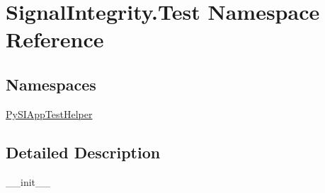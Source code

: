 \hypertarget{namespaceSignalIntegrity_1_1Test}{}\section{Signal\+Integrity.\+Test Namespace Reference}
\label{namespaceSignalIntegrity_1_1Test}
\subsection*{Namespaces}
\begin{DoxyCompactItemize}
\item 
 \hyperlink{namespaceSignalIntegrity_1_1Test_1_1PySIAppTestHelper}{Py\+S\+I\+App\+Test\+Helper}
\end{DoxyCompactItemize}


\subsection{Detailed Description}
\begin{DoxyVerb}__init__\end{DoxyVerb}
 